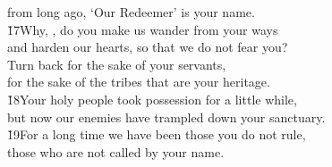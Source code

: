 \begin{poetry}
\poemll    from long ago, `Our Redeemer' is your name. \\
\poeml \v{17}Why, , do you make us wander from your ways \\
\poemll    and harden our hearts, so that we do not fear you? \\
\poeml Turn back for the sake of your servants, \\
\poemll    for the sake of the tribes that are your heritage. \\
\poeml \v{18}Your holy people took possession for a little while, \\
\poemll    but now our enemies have trampled down your sanctuary. \\
\poeml \v{19}For a long time we have been those you do not rule, \\
\poemll    those who are not called by your name.
\end{poetry}

